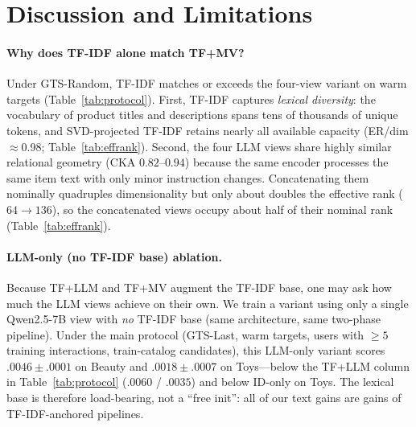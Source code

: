 \documentclass[sigconf,natbib=true,anonymous]{acmart}
\newcommand{\tfidf}{\textsc{TF-IDF}\xspace}
\newcommand{\tfllm}{\textsc{TF+LLM}\xspace}
\newcommand{\tfmv}{\textsc{TF+MV}\xspace}
\begin{document}
\section{Discussion and Limitations}
\label{sec:discussion}

\paragraph{Why does TF-IDF alone match \tfmv?}
Under GTS-Random, \tfidf matches or exceeds the four-view variant on warm targets (Table~\ref{tab:protocol}).
First, \tfidf captures \emph{lexical diversity}: the vocabulary of product titles and descriptions spans tens of thousands of unique tokens, and SVD-projected TF-IDF retains nearly all available capacity (ER/dim $\approx$0.98; Table~\ref{tab:effrank}).
Second, the four LLM views share highly similar relational geometry (CKA $0.82$--$0.94$) because the same encoder processes the same item text with only minor instruction changes.
Concatenating them nominally quadruples dimensionality but only about doubles the effective rank ($64 \to 136$), so the concatenated views occupy about half of their nominal rank (Table~\ref{tab:effrank}).

\paragraph{LLM-only (no \tfidf base) ablation.}
Because \tfllm and \tfmv augment the \tfidf base, one may ask how much the LLM views achieve on their own.
We train a variant using only a single Qwen2.5-7B view with \emph{no} \tfidf base (same architecture, same two-phase pipeline).
Under the main protocol (GTS-Last, warm targets, users with $\ge 5$ training interactions, train-catalog candidates), this LLM-only variant scores $.0046\pm.0001$ on Beauty and $.0018\pm.0007$ on Toys---below the \tfllm column in Table~\ref{tab:protocol} ($.0060$ / $.0035$) and below ID-only on Toys.
The lexical base is therefore load-bearing, not a ``free init'': all of our text gains are gains of \tfidf-anchored pipelines.
\end{document}
